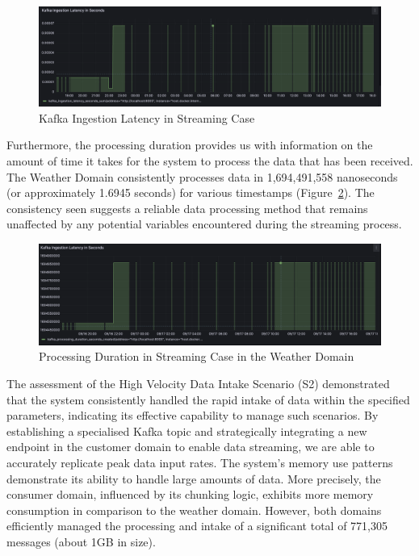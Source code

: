 \documentclass[review]{elsarticle}
\begin{document}
\begin{figure}

  \centering

  \includegraphics[width=\textwidth]{images/kafka-ingestion-latency-sum-streaming-case.png}

  \caption{Kafka Ingestion Latency in Streaming Case}

  \label{kafkaIngestionLatencyInStreamingCase}

\end{figure}

Furthermore, the processing duration provides us with information on the amount of time it takes for the system to process the data that has been received. The Weather Domain consistently processes data in 1,694,491,558 nanoseconds (or approximately 1.6945 seconds) for various timestamps (Figure~\ref{processingDurationInStreamingCaseInWeatherDomain}). The consistency seen suggests a reliable data processing method that remains unaffected by any potential variables encountered during the streaming process.

\begin{figure}

  \centering

  \includegraphics[width=\textwidth]{images/processing-duration-streaming-case-in-weather-domain.png}

  \caption{Processing Duration in Streaming Case in the Weather Domain}

  \label{processingDurationInStreamingCaseInWeatherDomain}

\end{figure}

The assessment of the High Velocity Data Intake Scenario (S2) demonstrated that the system consistently handled the rapid intake of data within the specified parameters, indicating its effective capability to manage such scenarios. By establishing a specialised Kafka topic and strategically integrating a new endpoint in the customer domain to enable data streaming, we are able to accurately replicate peak data input rates. The system's memory use patterns demonstrate its ability to handle large amounts of data. More precisely, the consumer domain, influenced by its chunking logic, exhibits more memory consumption in comparison to the weather domain. However, both domains efficiently managed the processing and intake of a significant total of 771,305 messages (about 1GB in size). 
\end{document}
